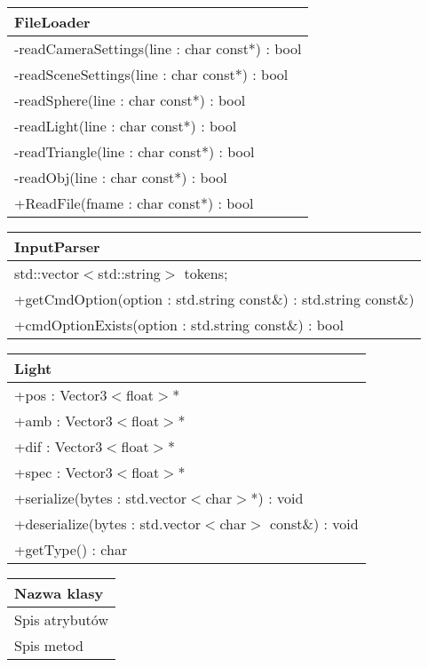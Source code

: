 \begin{center}
    \begin{tabular}{|l|}
    \hline
    FileLoader \\ \hline
    -readCameraSettings(line : char const*) : bool \\
    -readSceneSettings(line : char const*) : bool \\
    -readSphere(line : char const*) : bool \\
    -readLight(line : char const*) : bool \\
    -readTriangle(line : char const*) : bool \\
    -readObj(line : char const*) : bool \\
	+ReadFile(fname : char const*) : bool \\ \hline
    \end{tabular}
\end{center}


\begin{center}
    \begin{tabular}{|l|}
    \hline
    InputParser \\ \hline
    std::vector$<$std::string$>$ tokens; \\ \hline
    +getCmdOption(option : std.string const\&) : std.string const\&) \\
    +cmdOptionExists(option : std.string const\&) : bool \\ \hline
    \end{tabular}
\end{center}


\begin{center}
    \begin{tabular}{|l|}
    \hline
    Light \\ \hline
    +pos : Vector3$<$float$>$* \\ 
    +amb : Vector3$<$float$>$* \\
    +dif : Vector3$<$float$>$* \\
    +spec : Vector3$<$float$>$* \\
    \hline
	+serialize(bytes : std.vector$<$char$>$*) : void \\ 
	+deserialize(bytes : std.vector$<$char$>$ const\&) : void \\
	+getType() : char \\
	\hline
    \end{tabular}
\end{center}


\begin{center}
    \begin{tabular}{|l|}
    \hline
    Nazwa klasy \\ \hline
    Spis atrybutów \\ \hline
	Spis metod \\ \hline
    \end{tabular}
\end{center}

